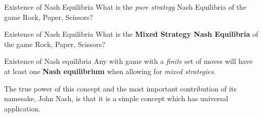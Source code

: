 \begin{frame}{Existence of Nash Equilibria}
  What is the \textit{pure strategy} Nash Equilibria of the game
  \alert{Rock, Paper, Scissors}?
\end{frame}

\begin{frame}{Existence of Nash Equilibria}
  What is the \textbf{Mixed Strategy Nash Equilibria} of the game
  \alert{Rock, Paper, Scissors}?
\end{frame}


\begin{frame}{Existence of Nash equilibria}
  Any with game with a \textit{finite} set of moves
  will have at least one \textbf{Nash equilibrium}
  when allowing for \textit{mixed strategies}.

  The true power of this concept and the most important 
  contribution of its namesake, John Nash,
  is that it is a simple concept which has universal application.
\end{frame}


